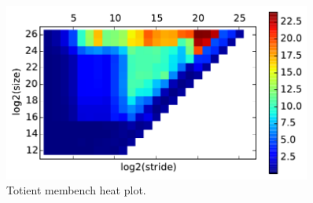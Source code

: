 \documentclass{hw}
\begin{document}
\begin{figure}[h]
  \centering
  \includegraphics[width=0.9\textwidth]{timings-heat-totient.pdf}
  \caption{Totient membench heat plot.}
  \label{fig:totienttimingsheat}
\end{figure}
\end{document}
